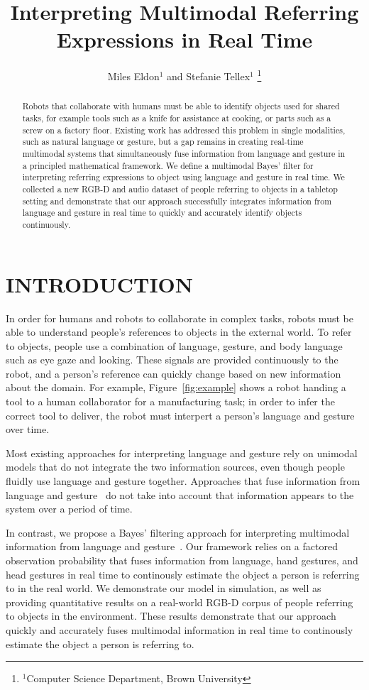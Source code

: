 \documentclass[letterpaper, 10 pt, conference]{ieeeconf}
\title{\LARGE \bf
Interpreting Multimodal Referring Expressions in Real Time}
\author{Miles Eldon$^{1}$ and Stefanie Tellex$^{1}$
\thanks{$^{1}$Computer Science Department, Brown University}
}
\begin{document}
\maketitle
\thispagestyle{empty}
\pagestyle{empty}

\begin{abstract}
Robots that collaborate with humans must be able to identify objects
used for shared tasks, for example tools such as a knife for
assistance at cooking, or parts such as a screw on a factory floor.
Existing work has addressed this problem in single modalities, such as
natural language or gesture, but a gap remains in creating real-time
multimodal systems that simultaneously fuse information from language
and gesture in a principled mathematical framework.  We define a
multimodal Bayes' filter for interpreting referring expressions to
object using language and gesture in real time.  We collected a new
RGB-D and audio dataset of people referring to objects in a tabletop
setting and demonstrate that our approach successfully integrates
information from language and gesture in real time to quickly and
accurately identify objects continuously.
\end{abstract}

\section{INTRODUCTION}

In order for humans and robots to collaborate in complex tasks, robots
must be able to understand people's references to objects in the
external world.  To refer to objects, people use a combination of
language, gesture, and body language such as eye gaze and looking.
These signals are provided continuously to the robot, and a person's
reference can quickly change based on new information about the
domain.  For example, Figure~\ref{fig:example} shows a robot handing a
tool to a human collaborator for a manufacturing task; in order to
infer the correct tool to deliver, the robot must interpert a person's
language and gesture over time.

Most existing approaches for interpreting language and gesture rely on
unimodal models that do not integrate the two information sources,
even though people fluidly use language and gesture together.
Approaches that fuse information from language and
gesture~\citep{matuszek14} do not take into account that information
appears to the system over a period of time.

In contrast, we propose a Bayes' filtering approach for interpreting
multimodal information from language and gesture~\citep{thrun08}.  Our
framework relies on a factored observation probability that fuses
information from language, hand gestures, and head gestures in real
time to continously estimate the object a person is referring to in
the real world.  We demonstrate our model in simulation, as well as
providing quantitative results on a real-world RGB-D corpus of people
referring to objects in the environment.  These results demonstrate
that our approach quickly and accurately fuses multimodal information
in real time to continously estimate the object a person is referring
to.
\end{document}
